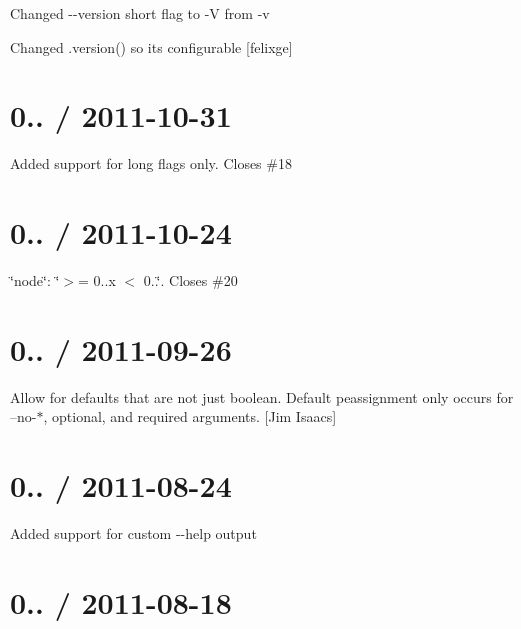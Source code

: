 \begin{DoxyItemize}
\item Changed {\ttfamily -\/-\/version} short flag to {\ttfamily -\/V} from {\ttfamily -\/v}
\item Changed {\ttfamily .version()} so it\textquotesingle{}s configurable \mbox{[}felixge\mbox{]}
\end{DoxyItemize}

\section*{0.. / 2011-\/10-\/31 }


\begin{DoxyItemize}
\item Added support for long flags only. Closes \#18
\end{DoxyItemize}

\section*{0.. / 2011-\/10-\/24 }


\begin{DoxyItemize}
\item \char`\"{}node\char`\"{}\+: \char`\"{}$>$= 0..\+x $<$ 0..\char`\"{}. Closes \#20
\end{DoxyItemize}

\section*{0.. / 2011-\/09-\/26 }


\begin{DoxyItemize}
\item Allow for defaults that are not just boolean. Default peassignment only occurs for --no-\/$\ast$, optional, and required arguments. \mbox{[}Jim Isaacs\mbox{]}
\end{DoxyItemize}

\section*{0.. / 2011-\/08-\/24 }


\begin{DoxyItemize}
\item Added support for custom {\ttfamily -\/-\/help} output
\end{DoxyItemize}

\section*{0.. / 2011-\/08-\/18 }


